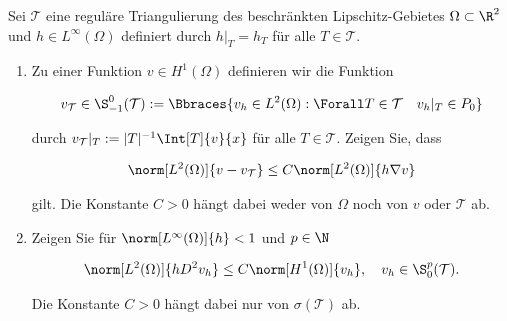 
\begin{exercise}

Sei $\mathcal{T}$ eine reguläre Triangulierung des beschränkten Lipschitz-Gebietes $\Omega \subset \R^2$ und $h \in L^\infty(\Omega)$ definiert durch $h|_T = h_T$ für alle $T \in \mathcal{T}$.

\begin{enumerate}[label = \textbf{\alph*)}]

  \item Zu einer Funktion $v \in H^1(\Omega)$ definieren wir die Funktion
  
  \begin{align*}
    v_\mathcal{T} \in \S_{-1}^0(\mathcal{T})
    :=
    \Bbraces
    {
      v_h \in L^2(\Omega):
      \Forall T \in \mathcal{T}
      \quad
      v_h|_T \in P_0
    }
  \end{align*}
  
  durch $v_\mathcal{T}|_T := |T|^{-1} \Int[T]{v}{x}$ für alle $T \in \mathcal{T}$.
  Zeigen Sie, dass

  \begin{align*}
    \norm[L^2(\Omega)]{v - v_\mathcal{T}}
    \leq
    C \norm[L^2(\Omega)]{h \nabla v}
  \end{align*}

  gilt.
  Die Konstante $C > 0$ hängt dabei weder von $\Omega$ noch von $v$ oder $\mathcal{T}$ ab.

  \item Zeigen Sie für $\norm[L^\infty(\Omega)]{h} < 1$ und $p \in \N$

  \begin{align}
    \norm[L^2(\Omega)]{h D^2 v_h}
    \leq
    C \norm[H^1(\Omega)]{v_h},
    \quad
    v_h \in \S_0^p(\mathcal{T}).
  \end{align}

  Die Konstante $C > 0$ hängt dabei nur von $\sigma(\mathcal{T})$ ab.

\end{enumerate}

\end{exercise}


